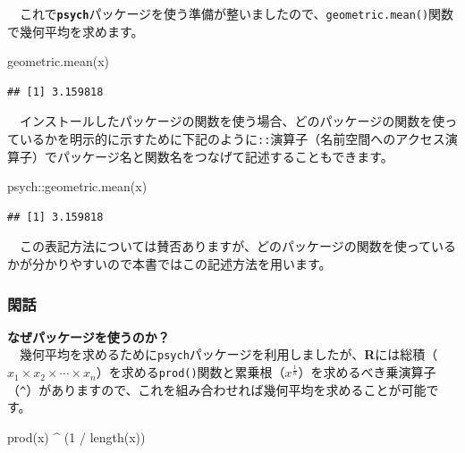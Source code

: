\documentclass[
  12pt,
]{book}
\newenvironment{Shaded}{\begin{snugshade}}{\end{snugshade}}
\newcommand{\DecValTok}[1]{\textcolor[rgb]{0.00,0.00,0.81}{#1}}
\newcommand{\FunctionTok}[1]{\textcolor[rgb]{0.00,0.00,0.00}{#1}}
\newcommand{\NormalTok}[1]{#1}
\newcommand{\SpecialCharTok}[1]{\textcolor[rgb]{0.00,0.00,0.00}{#1}}
\begin{document}
　これで\textbf{\texttt{psych}}パッケージを使う準備が整いましたので、\texttt{geometric.mean()}関数で幾何平均を求めます。

\begin{Shaded}
\begin{Highlighting}[numbers=left,,]
\FunctionTok{geometric.mean}\NormalTok{(x)}
\end{Highlighting}
\end{Shaded}

\begin{verbatim}
## [1] 3.159818
\end{verbatim}

　インストールしたパッケージの関数を使う場合、どのパッケージの関数を使っているかを明示的に示すために下記のように\texttt{::}演算子（名前空間へのアクセス演算子）でパッケージ名と関数名をつなげて記述することもできます。

\begin{Shaded}
\begin{Highlighting}[numbers=left,,]
\NormalTok{psych}\SpecialCharTok{::}\FunctionTok{geometric.mean}\NormalTok{(x)}
\end{Highlighting}
\end{Shaded}

\begin{verbatim}
## [1] 3.159818
\end{verbatim}

　この表記方法については賛否ありますが、どのパッケージの関数を使っているかが分かりやすいので本書ではこの記述方法を用います。

\hypertarget{ux9591ux8a71}{%
\subsubsection*{閑話}\label{ux9591ux8a71}}

\textbf{なぜパッケージを使うのか？}\\
　幾何平均を求めるために\texttt{psych}パッケージを利用しましたが、\textbf{R}には総積（\(x_1 \times x_2 \times \cdots \times x_n\)）を求める\texttt{prod()}関数と累乗根（\(x^{\frac{1}{n}}\)）を求めるべき乗演算子（\texttt{\^{}}）がありますので、これを組み合わせれば幾何平均を求めることが可能です。

\begin{Shaded}
\begin{Highlighting}[numbers=left,,]
\FunctionTok{prod}\NormalTok{(x) }\SpecialCharTok{\^{}}\NormalTok{ (}\DecValTok{1} \SpecialCharTok{/} \FunctionTok{length}\NormalTok{(x))}
\end{Highlighting}
\end{Shaded}
\end{document}
